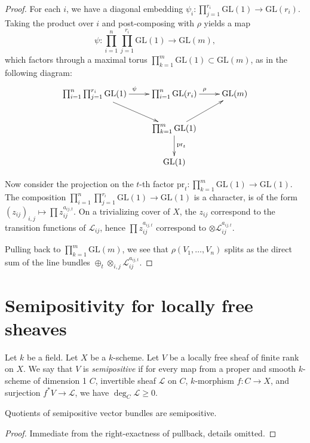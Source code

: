 \begin{proof}
For each $i$, we have a diagonal embedding $\psi_i:\prod_{j=1}^{r_i}\mathrm{GL}(1)\to \mathrm{GL}(r_i)$.
Taking the product over $i$ and post-composing with $\rho$ yields a map
$$
\psi:\prod_{i=1}^{n}\prod_{j=1}^{r_i}\mathrm{GL}(1)\to \mathrm{GL}(m),
$$
which factors through a maximal torus $\prod_{k=1}^{m}\mathrm{GL}(1)\subset \mathrm{GL}(m)$, as in the following diagram:
$$
\xymatrix{
\prod_{i=1}^{n}\prod_{j=1}^{r_i} \mathrm{GL}(1)\ar[r]^{\psi} \ar[rd] &\prod_{i=1}^{n}\mathrm{GL}(r_i)\ar[r]^{\rho} &\mathrm{GL}(m)\\
&\prod_{k=1}^{m}\mathrm{GL}(1)\ar[ru]\ar[d]^{\mathrm{pr}_t}&\\
&\mathrm{GL}(1)&
}
$$


Now consider the projection on the $t$-th factor $\mathrm{pr}_t:\prod_{k=1}^m\mathrm{GL}(1)\to \mathrm{GL}(1)$. The composition $\prod_{i=1}^n\prod_{j=1}^{r_i} \mathrm{GL}(1)\to \mathrm{GL}(1)$ is a character, is of the form $(z_{ij})_{i,j}\mapsto \prod z_{ij}^{a_{ij,t}}$. On a trivializing cover of $X$, the $z_{ij}$ correspond to the transition functions of $\mathcal{L}_{ij}$, hence $\prod z_{ij}^{a_{ij,t}}$ correspond to $\otimes\mathcal{L}_{ij}^{a_{ij,t}}$.

Pulling back to $\prod_{k=1}^{m} \mathrm{GL}(m)$, we see that $\rho(V_1,\ldots,V_n)$ splits as the direct sum of the line bundles $\oplus_t \otimes_{i,j}\mathcal{L}_{ij}^{a_{ij,t}}$.
\end{proof}

\section{Semipositivity for locally free sheaves}

\begin{definition}\label{def_semipos_bundle}
Let $k$ be a field.
Let $X$ be a $k$-scheme.
Let $V$ be a locally free sheaf of finite rank on $X$.
We say that $V$ is \textit{semipositive} if for every map from a proper and smooth $k$-scheme of dimension 1 $C$, invertible sheaf $\mathcal{L}$ on $C$, $k$-morphism $f:C\to X$, and surjection $f^{*}V\to\mathcal{L}$, we have $\deg_C\mathcal{L}\ge0$.\end{definition}


\begin{lemma}
Quotients of semipositive vector bundles are semipositive.
\end{lemma}

\begin{proof}
Immediate from the right-exactness of pullback, details omitted.
\end{proof}


